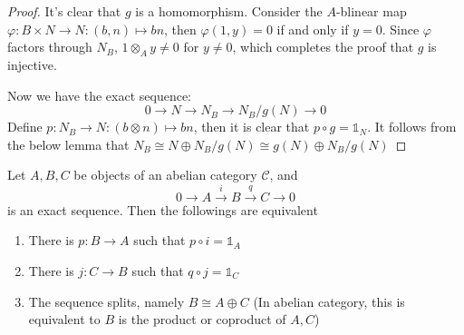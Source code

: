 \documentclass{solution}
\begin{document}
\begin{proof}
    It's clear that $g$ is a homomorphism. Consider the $A$-blinear map $\varphi: B \times N \rightarrow N: (b, n) \mapsto bn$, then $\varphi(1, y) = 0$ if and only if $y = 0$. Since $\varphi$ factors through $N_B$, $1 \otimes_A y \ne 0$ for $y \ne 0$, which completes the proof that $g$ is injective.

    Now we have the exact sequence:
    $$0 \rightarrow N \rightarrow N_B \rightarrow N_B / g(N) \rightarrow 0$$
    Define $p: N_B \rightarrow N: (b \otimes n) \mapsto bn$, then it is clear that $p \circ g = \mathds{1}_N$. It follows from the below lemma that $N_B \cong N \oplus N_B / g(N) \cong g(N) \oplus N_B / g(N)$
\end{proof}

\begin{lemma}
    Let $A, B, C$ be objects of an abelian category $\mathcal{C}$, and
    $$0 \rightarrow A \xrightarrow{i} B \xrightarrow{q} C \rightarrow 0$$
    is an exact sequence. Then the followings are equivalent
    \begin{enumerate}
        \item There is $p: B \rightarrow A$ such that $p \circ i = \mathds{1}_A$
        \item There is $j: C \rightarrow B$ such that $q \circ j = \mathds{1}_C$
        \item The sequence splits, namely $B \cong A \oplus C$ (In abelian category, this is equivalent to $B$ is the product or coproduct of $A, C$)
    \end{enumerate}
\end{lemma}
\end{document}
